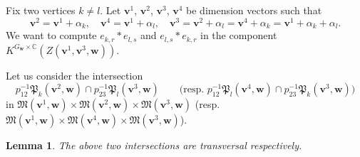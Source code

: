 \documentclass[12pt]{amsart}
\def\Bbb{\mathbb}
\def\frak{\mathfrak}
\newtheorem{Lemma}[equation]{Lemma}
\theoremstyle{definition}
\theoremstyle{remark}
\numberwithin{equation}{subsection}
\newcommand{\C}{{\Bbb C}}
\newcommand{\M}{{\frak M}} %
\newcommand{\bv}{{\mathbf v}} %
\newcommand{\bw}{{\mathbf w}} %
\newcommand{\Pa}{{\frak P}} %
\begin{document}
Fix two vertices $k\neq l$. Let $\bv^1$, $\bv^2$, $\bv^3$, $\bv^4$ be
dimension vectors such that
\begin{equation*}
 \bv^2 = \bv^1 + \alpha_k, \quad
 \bv^4 = \bv^1 + \alpha_l, \quad
 \bv^3 = \bv^2 + \alpha_l = \bv^4 + \alpha_k
 = \bv^1 + \alpha_k + \alpha_l.
\end{equation*}
We want to compute $e_{k,r} * e_{l,s}$ and $e_{l,s} * e_{k,r}$ in the
component $K^{G_\bw\times\C}(Z(\bv^1,\bv^3,\bw))$.

Let us consider the intersection
\begin{equation*}
  p_{12}^{-1}\Pa_k(\bv^2,\bw) \cap p_{23}^{-1}\Pa_{l}(\bv^3,\bw)
  \qquad\text{(resp.\ 
  $p_{12}^{-1}\Pa_{l}(\bv^4,\bw) \cap p_{23}^{-1}\Pa_{k}(\bv^3,\bw)$)}
\end{equation*}
in $\M(\bv^1,\bw)\times\M(\bv^2,\bw)\times\M(\bv^3,\bw)$
(resp.\ $\M(\bv^1,\bw)\times\M(\bv^4,\bw)\times\M(\bv^3,\bw)$).

\begin{Lemma}\label{lem:intersect}
The above two intersections are transversal respectively.
\end{Lemma}
\end{document}

